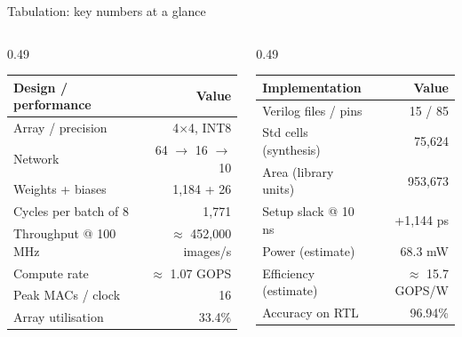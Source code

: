 \documentclass[aspectratio=169,10pt,t]{beamer}
\begin{document}
\begin{frame}{Tabulation: key numbers at a glance}
  \footnotesize
  \renewcommand{\arraystretch}{1.15}
  \begin{columns}[T]
    \begin{column}{0.49\textwidth}
      \begin{tabular}{@{}lr@{}}
        \toprule
        \textbf{Design / performance} & \textbf{Value}\\
        \midrule
        Array / precision & 4$\times$4, INT8\\
        Network & 64 $\to$ 16 $\to$ 10\\
        Weights + biases & 1,184 + 26\\
        Cycles per batch of 8 & 1,771\\
        Throughput @ 100 MHz & $\approx$ 452,000 images/s\\
        Compute rate & $\approx$ 1.07 GOPS\\
        Peak MACs / clock & 16\\
        Array utilisation & 33.4\%\\
        \bottomrule
      \end{tabular}
    \end{column}
    \begin{column}{0.49\textwidth}
      \begin{tabular}{@{}lr@{}}
        \toprule
        \textbf{Implementation} & \textbf{Value}\\
        \midrule
        Verilog files / pins & 15 / 85\\
        Std cells (synthesis) & 75,624\\
        Area (library units) & 953,673\\
        Setup slack @ 10 ns & +1,144 ps\\
        Power (estimate) & 68.3 mW\\
        Efficiency (estimate) & $\approx$ 15.7 GOPS/W\\
        Accuracy on RTL & 96.94\%\\
        \bottomrule
      \end{tabular}
    \end{column}
  \end{columns}
  \vspace{6pt}


\end{frame}
\end{document}

